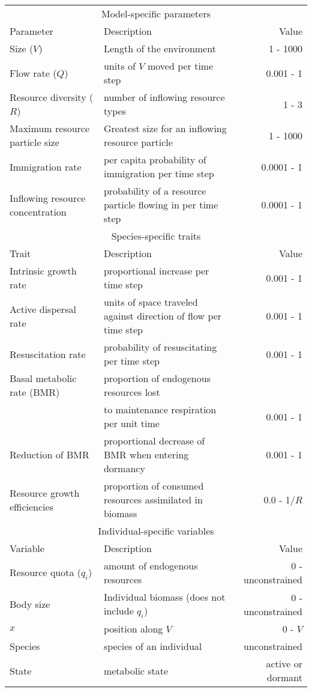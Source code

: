 \documentclass{article}
\begin{document}
\oddsidemargin-1cm
\textwidth19cm

\begin{tabular}{llr}
\hline
\multicolumn{3}{c}{Model-specific parameters} \\

\cline{1-3}
Parameter & Description & Value \\
\hline
Size ($V$) & Length of the environment & 1 - 1000 \\
Flow rate ($Q$) & units of $V$ moved per time step & 0.001 - 1 \\
Resource diversity ($R$) & number of inflowing resource types & 1 - 3 \\
Maximum resource particle size & Greatest size for an inflowing resource particle & 1 - 1000 \\
Immigration rate & per capita probability of immigration per time step  & 0.0001 - 1 \\
Inflowing resource concentration & probability of a resource particle flowing in per time step & 0.0001 - 1 \\  
\hline
\multicolumn{3}{c}{Species-specific traits} \\

\cline{1-3}
Trait & Description & Value \\
\hline
Intrinsic growth rate & proportional increase per time step & 0.001 - 1 \\
Active dispersal rate & units of space traveled against direction of flow per time step & 0.001 - 1 \\
Resuscitation rate & probability of resuscitating per time step & 0.001 - 1 \\
Basal metabolic rate (BMR) & proportion of endogenous resources lost \\
 & to maintenance respiration per unit time & 0.001 - 1 \\
Reduction of BMR & proportional decrease of BMR when entering dormancy  & 0.001 - 1 \\
Resource growth efficiencies & proportion of consumed resources assimilated in biomass  & 0.0 - 1/$R$ \\
\hline
\multicolumn{3}{c}{Individual-specific variables} \\

\cline{1-3}
Variable & Description & Value \\
\hline
Resource quota ($q_i$)  & amount of endogenous resources & 0 - unconstrained \\
Body size & Individual biomass (does not include $q_i$) & 0 - unconstrained \\
$x$ & position along $V$  & 0 - $V$      \\
Species & species of an individual & unconstrained \\
State & metabolic state & active or dormant \\
\hline

\end{tabular}
\end{document}
